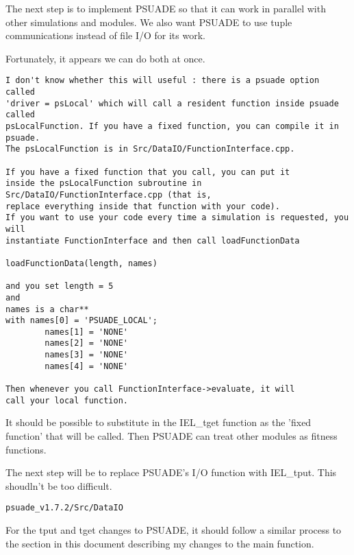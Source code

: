 The next step is to implement PSUADE so that it can work in parallel with other simulations and modules. We also want PSUADE to use tuple communications instead of file I/O for its work.

Fortunately, it appears we can do both at once. 

\begin{verbatim}
I don't know whether this will useful : there is a psuade option called
'driver = psLocal' which will call a resident function inside psuade called
psLocalFunction. If you have a fixed function, you can compile it in psuade.
The psLocalFunction is in Src/DataIO/FunctionInterface.cpp.

If you have a fixed function that you call, you can put it
inside the psLocalFunction subroutine in Src/DataIO/FunctionInterface.cpp (that is,
replace everything inside that function with your code).
If you want to use your code every time a simulation is requested, you will
instantiate FunctionInterface and then call loadFunctionData

loadFunctionData(length, names)

and you set length = 5
and 
names is a char**
with names[0] = 'PSUADE_LOCAL';
        names[1] = 'NONE'
        names[2] = 'NONE'
        names[3] = 'NONE'
        names[4] = 'NONE'

Then whenever you call FunctionInterface->evaluate, it will
call your local function.
\end{verbatim}

It should be possible to substitute in the IEL\_tget function as the 'fixed function' that will be called. Then PSUADE can treat other modules as fitness functions.


The next step will be to replace PSUADE's I/O function with IEL\_tput. This shoudln't be too difficult.

\begin{verbatim}
psuade_v1.7.2/Src/DataIO
\end{verbatim}


For the tput and tget changes to PSUADE, it should follow a similar process to the section in this document describing my changes to the main function.
